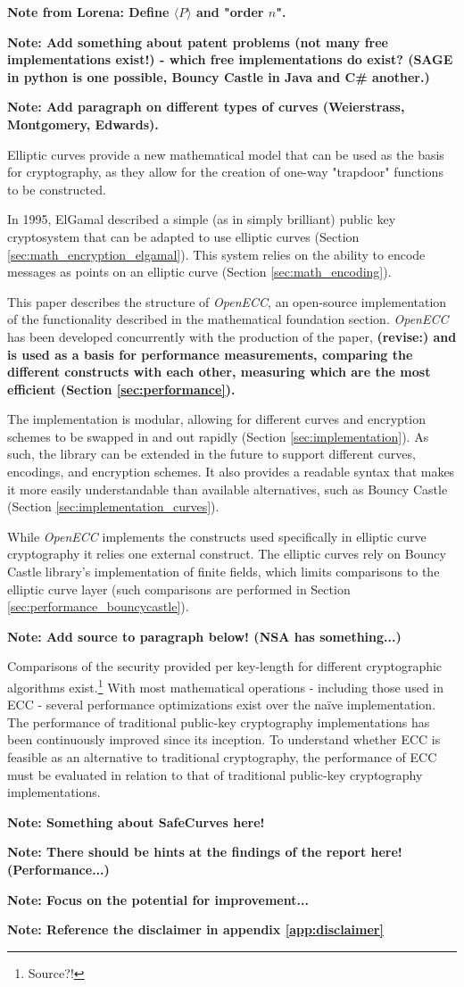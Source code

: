 \textbf{Note from Lorena: Define \(\langle P \rangle\) and "order \(n\)".}

\textbf{Note: Add something about patent problems (not many free implementations exist!) - which free
implementations do exist? (SAGE in python is one possible, Bouncy Castle in Java and C\# another.)}

\textbf{Note: Add paragraph on different types of curves (Weierstrass, Montgomery, Edwards).}

Elliptic curves provide a new mathematical model that can be used as the basis for cryptography,
as they allow for the creation of one-way "trapdoor" functions to be constructed.

In 1995, ElGamal described a simple (as in simply brilliant) public key cryptosystem that can be adapted
to use elliptic curves (Section \ref{sec:math_encryption_elgamal}). This system relies on the ability to
encode messages as points on an elliptic curve (Section \ref{sec:math_encoding}).

This paper describes the structure of \emph{OpenECC}, an open-source implementation of the functionality
described in the mathematical foundation section. \emph{OpenECC} has been developed concurrently with the
production of the paper, \textbf{(revise:) and is used as a basis for performance measurements, comparing the different constructs
with each other, measuring which are the most efficient (Section \ref{sec:performance}).}

The implementation is modular, allowing for different curves and encryption schemes to be swapped in and out
rapidly (Section \ref{sec:implementation}). As such, the library can be extended in the future to support different
curves, encodings, and encryption schemes. It also provides a readable syntax that makes it more easily
understandable than available alternatives, such as Bouncy Castle (Section \ref{sec:implementation_curves}).

While \emph{OpenECC} implements the constructs used specifically in elliptic curve cryptography it relies one external construct.
The elliptic curves rely on Bouncy Castle library's implementation of finite fields, which limits comparisons to the elliptic curve
layer (such comparisons are performed in Section \ref{sec:performance_bouncycastle}).

\textbf{Note: Add source to paragraph below! (NSA has something...)}

Comparisons of the security provided per key-length for different cryptographic algorithms exist.\footnote{Source?!} With
most mathematical operations - including those used in ECC - several performance optimizations exist over the naïve
implementation. The performance of traditional public-key cryptography implementations has been continuously improved
since its inception. To understand whether ECC is feasible as an alternative to traditional cryptography, the performance
of ECC must be evaluated in relation to that of traditional public-key cryptography implementations.

\textbf{Note: Something about SafeCurves here!}

\textbf{Note: There should be hints at the findings of the report here! (Performance...)}

\textbf{Note: Focus on the potential for improvement...}

\textbf{Note: Reference the disclaimer in appendix \ref{app:disclaimer}}